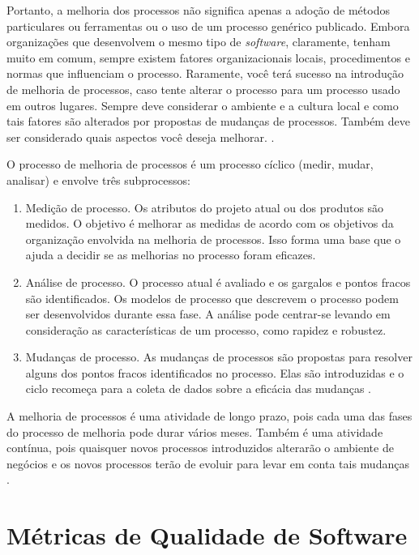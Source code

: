 \documentclass[12pt]{article}
\begin{document}
Portanto, a melhoria dos processos não significa apenas a adoção de métodos particulares ou ferramentas ou o uso de um processo genérico publicado. Embora organizações que desenvolvem o mesmo tipo de \textit{software}, claramente, tenham muito em comum, sempre existem fatores organizacionais locais, procedimentos e normas que influenciam o processo. Raramente, você terá sucesso na introdução de melhoria de processos, caso tente alterar o processo para um processo usado em outros lugares. Sempre deve considerar o ambiente e a cultura local e como tais fatores são alterados por propostas de mudanças de processos. Também deve ser considerado quais aspectos você deseja melhorar.  \cite{sommerville2007engenharia}.

O processo de melhoria de processos é um processo cíclico (medir, mudar, analisar) e envolve três subprocessos:
\begin{enumerate}
    \item Medição de processo. Os atributos do projeto atual ou dos produtos são medidos. O objetivo é melhorar as medidas de acordo com os objetivos da organização envolvida na melhoria de processos. Isso forma uma base que o ajuda a decidir se as melhorias no processo foram eficazes.
    \item Análise de processo. O processo atual é avaliado e os gargalos e pontos fracos são identificados. Os modelos de processo que descrevem o processo podem ser desenvolvidos durante essa fase. A análise pode centrar-se levando em consideração as características de um processo, como rapidez e robustez.
    \item Mudanças de processo. As mudanças de processos são propostas para resolver alguns dos pontos fracos identificados no processo. Elas são introduzidas e o ciclo recomeça para a coleta de dados sobre a eficácia das mudanças \cite{sommerville2007engenharia}.
\end{enumerate}

A melhoria de processos é uma atividade de longo prazo, pois cada uma das fases do processo de melhoria pode durar vários meses. Também é uma atividade contínua, pois quaisquer novos processos introduzidos alterarão o ambiente de negócios e os novos processos terão de evoluir para levar em conta tais mudanças \cite{sommerville2007engenharia}.

\section{Métricas de Qualidade de Software}
\end{document}
